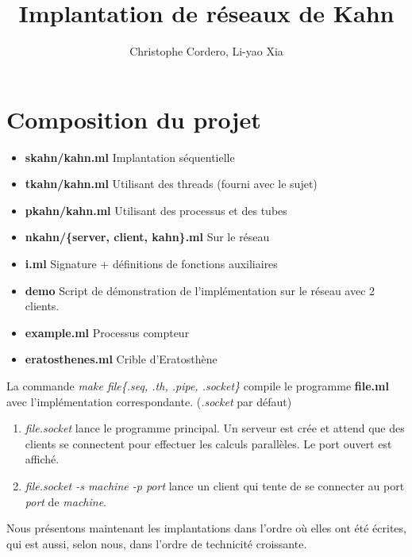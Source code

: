 \documentclass[11pt]{article}
\begin{document}
\title{Implantation de r\'eseaux de Kahn}

\author{Christophe Cordero, Li-yao Xia}

\maketitle

\section{Composition du projet}

\begin{itemize}
  \item {\bf skahn/kahn.ml} Implantation s\'equentielle
  \item {\bf tkahn/kahn.ml} Utilisant des threads (fourni avec le sujet)
  \item {\bf pkahn/kahn.ml} Utilisant des processus et des tubes
  \item {\bf nkahn/\{server, client, kahn\}.ml} Sur le r\'eseau
  \item {\bf i.ml} Signature + d\'efinitions de fonctions auxiliaires
  \item {\bf demo} Script de d\'emonstration de l'impl\'ementation
    sur le r\'eseau avec 2 clients.
  \item {\bf example.ml} Processus compteur
  \item {\bf eratosthenes.ml} Crible d'Eratosth\`ene
\end{itemize}

La commande {\it make file\{.seq, .th, .pipe, .socket\}}
compile le programme {\bf file.ml} avec l'impl\'ementation correspondante.
({\it .socket} par d\'efaut)

\smallskip

\begin{enumerate}
  \item {\it file.socket} lance le programme principal.
    Un serveur est cr\'ee et attend que des clients se connectent pour
    effectuer les calculs parall\`eles. Le port ouvert est affich\'e.
  \item {\it file.socket -s machine -p port} lance un client
    qui tente de se connecter au port {\it port} de {\it machine}.
\end{enumerate}

\smallskip

Nous pr\'esentons maintenant les implantations dans l'ordre
o\`u elles ont \'et\'e \'ecrites, qui est aussi, selon nous, dans l'ordre de technicit\'e croissante.
\end{document}
